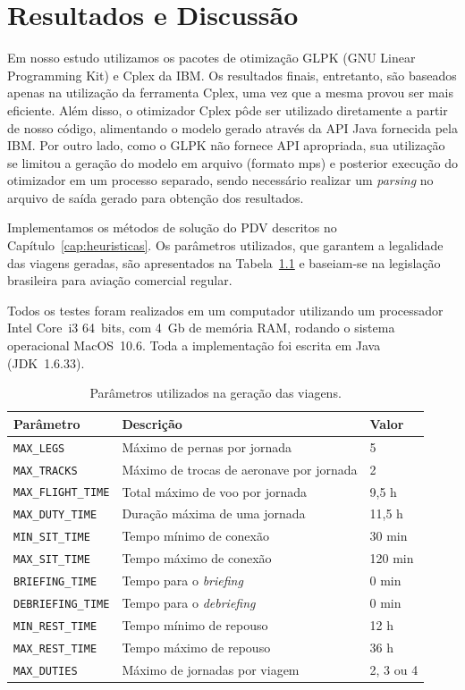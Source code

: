 \zerar
\chapter{Resultados e Discussão}
\label{cap:resultados}

Em nosso estudo utilizamos os pacotes de otimização GLPK (GNU Linear Programming Kit) e Cplex da
IBM. Os resultados finais, entretanto, são baseados apenas na utilização da ferramenta Cplex, uma
vez que a mesma provou ser mais eficiente. Além disso, o otimizador Cplex pôde ser utilizado
diretamente a partir de nosso código, alimentando o modelo gerado através da API Java fornecida pela
IBM. Por outro lado, como o GLPK não fornece API apropriada, sua utilização se limitou a geração do
modelo em arquivo (formato mps) e posterior execução do otimizador em um processo separado, sendo
necessário realizar um {\it parsing} no arquivo de saída gerado para obtenção dos resultados.

Implementamos os métodos de solução do PDV descritos no Capítulo~\ref{cap:heuristicas}. Os 
parâmetros utilizados, que garantem a legalidade das viagens geradas, são apresentados na
Tabela~\ref{tab:parametros} e baseiam-se na legislação brasileira para aviação comercial regular.

Todos os testes foram realizados em um computador utilizando um processador Intel Core~i3 64~bits, 
com 4~Gb de memória RAM, rodando o sistema operacional MacOS~10.6. Toda a implementação foi escrita 
em Java (JDK~1.6.33).

\begin{table}
	\begin{center}
		\begin{tabular}{|l|l|l|}
			\hline 
			\bf Parâmetro & \bf Descrição & \bf Valor \\
			\hline \hline 
			\verb|MAX_LEGS| & Máximo de pernas por jornada & 5 \\ \hline
			\verb|MAX_TRACKS| & Máximo de trocas de aeronave por jornada & 2 \\ \hline
			\verb|MAX_FLIGHT_TIME| & Total máximo de voo por jornada & 9,5 h \\ \hline
			\verb|MAX_DUTY_TIME| & Duração máxima de uma jornada & 11,5 h \\ \hline
			\verb|MIN_SIT_TIME| & Tempo mínimo de conexão & 30 min \\ \hline
			\verb|MAX_SIT_TIME| & Tempo máximo de conexão & 120 min \\ \hline
			\verb|BRIEFING_TIME| & Tempo para o {\it briefing} & 0 min \\ \hline
			\verb|DEBRIEFING_TIME| & Tempo para o {\it debriefing} & 0 min \\ \hline
			\verb|MIN_REST_TIME| & Tempo mínimo de repouso & 12 h \\ \hline
			\verb|MAX_REST_TIME| & Tempo máximo de repouso & 36 h \\ \hline
			\verb|MAX_DUTIES| & Máximo de jornadas por viagem & 2, 3 ou 4 \\ \hline
			\end{tabular} 
			\caption{Parâmetros utilizados na geração das viagens.}
			\label{tab:parametros}
	\end{center}
\end{table}

